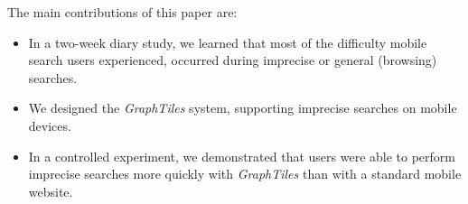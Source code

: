 The main contributions of this paper are:
\begin{itemize}
\item In a two-week diary study, we learned that most of the difficulty mobile search users experienced, occurred during imprecise or general (browsing) searches.  
\item We designed the \textit{GraphTiles} system, supporting imprecise searches on mobile devices.
\item In a controlled experiment, we demonstrated that users were able to perform imprecise searches more quickly with \textit{GraphTiles} than with a standard mobile website.
\end{itemize}


